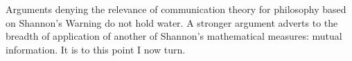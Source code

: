 
Arguments denying the relevance of communication theory for philosophy based on {\sc Shannon's Warning} do not hold water.
A stronger argument adverts to the breadth of application of another of Shannon's mathematical measures: mutual information.
It is to this point I now turn.





